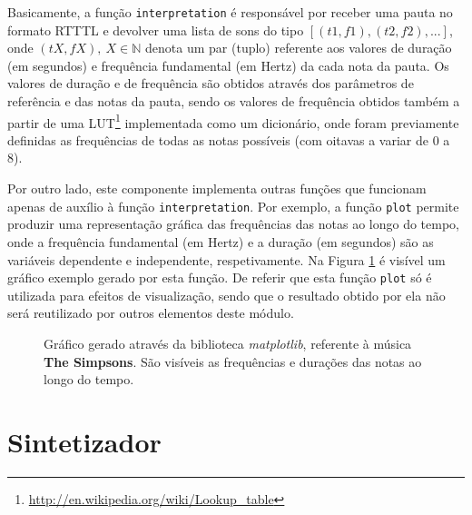 \documentclass[a4paper,11pt,openright,oneside]{report}
\begin{document}
Basicamente, a função \verb|interpretation| é responsável por receber uma pauta no formato RTTTL e devolver uma lista de sons do tipo $[(t1, f1), (t2, f2), ...]$, onde $(tX, fX),\ X \in \mathbb{N}$ denota um par (tuplo) referente aos valores de duração (em segundos) e frequência fundamental (em Hertz) da cada nota da pauta. Os valores de duração e de frequência são obtidos através dos parâmetros de referência e das notas da pauta, sendo os valores de frequência obtidos também a partir de uma LUT\footnote{\url{http://en.wikipedia.org/wiki/Lookup_table}} implementada como um dicionário, onde foram previamente definidas as frequências de todas as notas possíveis (com oitavas a variar de 0 a 8).

Por outro lado, este componente implementa outras funções que funcionam apenas de auxílio à função \verb|interpretation|. Por exemplo, a função \verb|plot| permite produzir uma representação gráfica das frequências das notas ao longo do tempo, onde a frequência fundamental (em Hertz) e a duração (em segundos) são as variáveis dependente e independente, respetivamente. Na Figura \ref{fig:sr3} é visível um gráfico exemplo gerado por esta função. De referir que esta função \verb|plot| só é utilizada para efeitos de visualização, sendo que o resultado obtido por ela não será reutilizado por outros elementos deste módulo.

\begin{figure}[ht]	
\center
{}
\caption{Gráfico gerado através da biblioteca \textit{matplotlib}, referente à música \textbf{The Simpsons}. São visíveis as frequências e durações das notas ao longo do tempo.}
\label{fig:sr3}
\end{figure}

\section{Sintetizador}
\label{sec:synthesizer}
\end{document}
